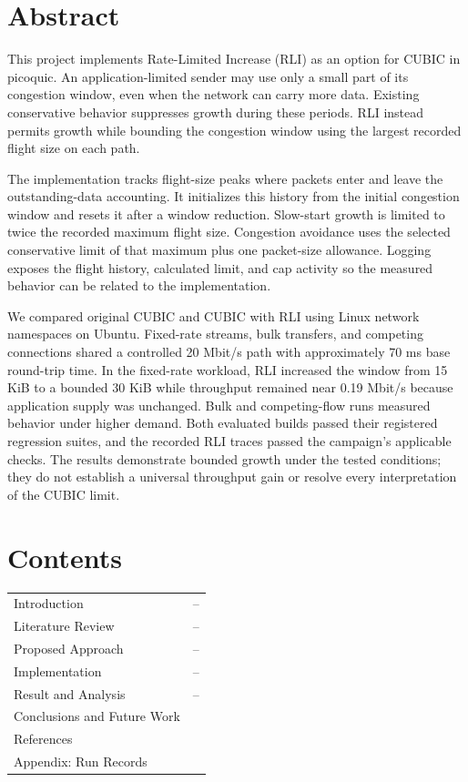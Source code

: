 \clearpage
\section*{Abstract}
\label{sec:abstract}
This project implements Rate-Limited Increase (RLI) as an option for CUBIC in picoquic. An application-limited sender may use only a small part of its congestion window, even when the network can carry more data. Existing conservative behavior suppresses growth during these periods. RLI instead permits growth while bounding the congestion window using the largest recorded flight size on each path.

The implementation tracks flight-size peaks where packets enter and leave the outstanding-data accounting. It initializes this history from the initial congestion window and resets it after a window reduction. Slow-start growth is limited to twice the recorded maximum flight size. Congestion avoidance uses the selected conservative limit of that maximum plus one packet-size allowance. Logging exposes the flight history, calculated limit, and cap activity so the measured behavior can be related to the implementation.

We compared original CUBIC and CUBIC with RLI using Linux network namespaces on Ubuntu. Fixed-rate streams, bulk transfers, and competing connections shared a controlled 20 Mbit/s path with approximately 70 ms base round-trip time. In the fixed-rate workload, RLI increased the window from 15 KiB to a bounded 30 KiB while throughput remained near 0.19 Mbit/s because application supply was unchanged. Bulk and competing-flow runs measured behavior under higher demand. Both evaluated builds passed their registered regression suites, and the recorded RLI traces passed the campaign's applicable checks. The results demonstrate bounded growth under the tested conditions; they do not establish a universal throughput gain or resolve every interpretation of the CUBIC limit.

\clearpage
\section*{Contents}
\begin{tabularx}{\linewidth}{@{}Xr@{}}
Introduction & \pageref{sec:introduction}--\pageref{sec:introduction-end}\\
Literature Review & \pageref{sec:literature}--\pageref{sec:literature-end}\\
Proposed Approach & \pageref{sec:approach}--\pageref{sec:approach-end}\\
Implementation & \pageref{sec:implementation}--\pageref{sec:implementation-end}\\
Result and Analysis & \pageref{sec:results}--\pageref{sec:results-end}\\
Conclusions and Future Work & \pageref{sec:conclusions}\\
References & \pageref{sec:references}\\
Appendix: Run Records & \pageref{sec:appendix}\\
\end{tabularx}
